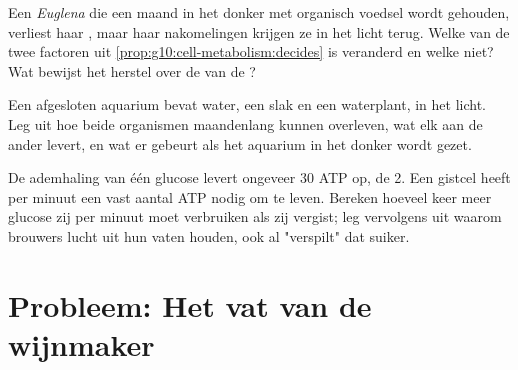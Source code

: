 \begin{exercise}[$\star\star\star$]\label{exo:g10:cell-metabolism:13}
Een \emph{Euglena} die een maand in het donker met organisch voedsel
wordt gehouden, verliest haar , maar haar nakomelingen
krijgen ze in het licht terug. Welke van de twee factoren uit
\cref{prop:g10:cell-metabolism:decides} is veranderd en welke niet? Wat
bewijst het herstel over de  van de ?
\end{exercise}

\begin{exercise}[$\star\star\star$]\label{exo:g10:cell-metabolism:14}
Een afgesloten aquarium bevat water, een slak en een waterplant, in het
licht. Leg uit hoe beide organismen maandenlang kunnen overleven, wat
elk aan de ander levert, en wat er gebeurt als het aquarium in het
donker wordt gezet.
\end{exercise}

\begin{exercise}[$\star\star\star$]\label{exo:g10:cell-metabolism:15}
De ademhaling van één glucose levert ongeveer 30 ATP op, de  2.
Een gistcel heeft per minuut een vast aantal ATP nodig om te leven.
Bereken hoeveel keer meer glucose zij per minuut moet verbruiken als zij
vergist; leg vervolgens uit waarom brouwers lucht uit hun vaten houden,
ook al "verspilt" dat suiker.
\end{exercise}

\section{Probleem: Het vat van de wijnmaker}


